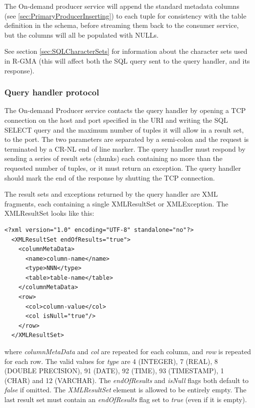 The On-demand producer service will append the standard metadata columns
(see \ref{sec:PrimaryProducerInserting}) to each tuple for
consistency with the table definition in the schema, before streaming
them back to the consumer service, but the columns will all be populated
with NULLs.

See section
\ref{sec:SQLCharacterSets} for information about the character sets used in
R-GMA (this will affect both the SQL query sent to the query handler, and its
response).

\subsubsection{Query handler protocol}

The On-demand Producer service contacts the query handler by opening a TCP
connection on the host
and port specified in the URI and writing the SQL SELECT query and the maximum
number of tuples it will allow in a result set, to the port. The two parameters
are separated by a semi-colon and the request is terminated by a CR-NL end of 
line marker. The query handler must respond by sending a series of result sets
(chunks) each containing no more than the requested number of tuples, or it must
return an exception. The query handler should mark the end of the response by
shutting the TCP connection.

The result sets and exceptions returned by the query handler are XML fragments,
each containing a single XMLResultSet or XMLException. The XMLResultSet looks
like this:

\begin{verbatim}
<?xml version="1.0" encoding="UTF-8" standalone="no"?>
  <XMLResultSet endOfResults="true">
    <columnMetaData>
      <name>column-name</name>
      <type>NNN</type>
      <table>table-name</table>
    </columnMetaData>
    <row>
      <col>column-value</col>
      <col isNull="true"/>
    </row>
  </XMLResultSet>
\end{verbatim}
                                                                                
where \textit{columnMetaData} and \textit{col} are repeated for each
column, and \textit{row} is repeated for each row. The valid values
for \textit{type} are 4 (INTEGER), 7 (REAL), 8 (DOUBLE PRECISION), 91
(DATE), 92 (TIME), 93 (TIMESTAMP), 1 (CHAR) and 12 (VARCHAR). The
\textit{endOfResults} and \textit{isNull} flags both default to \textit{false} if
omitted. The \textit{XMLResultSet} element is allowed to be entirely
empty.  The last result set must contain an \textit{endOfResults} flag
set to \textit{true} (even if it is empty).

